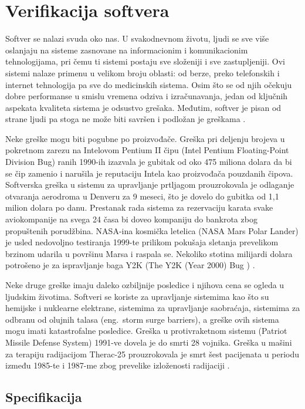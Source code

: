 \documentclass[12pt,oneside]{memoir}
\begin{document}
\chapter{Verifikacija softvera}

Softver se nalazi svuda oko nas. U svakodnevnom životu, ljudi se sve više oslanjaju na sisteme zasnovane na informacionim i komunikacionim tehnologijama, pri čemu ti sistemi postaju sve složeniji i sve zastupljeniji. Ovi sistemi nalaze primenu u velikom broju oblasti: od berze, preko telefonskih i internet tehnologija pa sve do medicinskih sistema. Osim što se od njih očekuju dobre performanse u smislu vremena odziva i izračunavanja, jedan od ključnih aspekata kvaliteta sistema je odsustvo grešaka. Međutim, softver je pisan od strane ljudi pa stoga ne može biti savršen i podložan je greškama \cite{PoMC, SoftTest}.

Neke greške mogu biti pogubne po proizvođače. Greška pri deljenju brojeva u pokretnom zarezu na Intelovom Pentium II čipu (Intel Pentium Floating-Point Division Bug) ranih 1990-ih izazvala je gubitak od oko 475 miliona dolara da bi se čip zamenio i narušila je reputaciju Intela kao proizvođača pouzdanih čipova. Softverska greška u sistemu za upravljanje prtljagom prouzrokovala je odlaganje otvaranja aerodroma u Denveru za 9 meseci, što je dovelo do gubitka od 1,1 milion dolara po danu. Prestanak rada sistema za rezervaciju karata svake aviokompanije na svega 24 časa bi doveo kompaniju do bankrota zbog propuštenih porudžbina. NASA-ina kosmička letelica (NASA Mars Polar Lander) je usled nedovoljno testiranja 1999-te prilikom pokušaja sletanja prevelikom brzinom udarila u površinu Marsa i raspala se. Nekoliko stotina milijardi dolara potrošeno je za ispravljanje baga Y2K (The Y2K (Year 2000) Bug \cite{y2k}) \cite{PoMC, SoftTest}. 

Neke druge greške imaju daleko ozbiljnije posledice i njihova cena se ogleda u ljudskim životima. Softveri se koriste za upravljanje sistemima kao što su hemijske i nuklearne elektrane, sistemima za upravljanje saobraćaja, sistemima za odbranu od olujnih talasa (eng.~storm surge barriers), a greške ovih sistema mogu imati katastrofalne posledice. Greška u protivraketnom sistemu (Patriot Missile Defense System) 1991-ve dovela je do smrti 28 vojnika. Greška u mašini za terapiju radijacijom Therac-25 prouzrokovala je smrt šest pacijenata u periodu između 1985-te i 1987-me zbog prevelike izloženosti radijaciji  \cite{PoMC, SoftTest}.

\section{Specifikacija}
\end{document}
